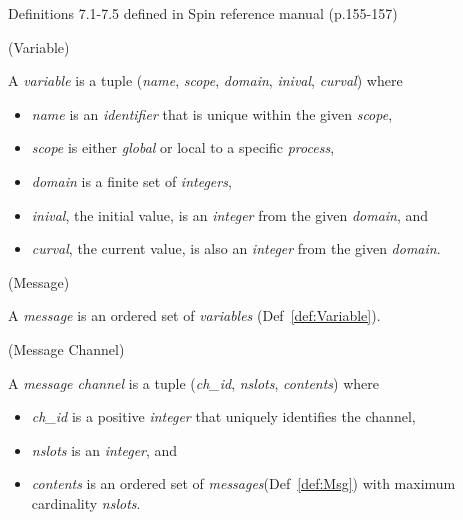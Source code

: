 Definitions 7.1-7.5 defined in Spin reference manual (p.155-157) \cite{spinreferencemanualbook}

\begin{definition}{}{}
\label{def:Variable}
(Variable) 

A \textit{variable} is a tuple (\textit{name}, \textit{scope}, \textit{domain}, \textit{inival}, \textit{curval}) where

\begin{itemize}
\item[] \textit{name} is an \textit{identifier} that is unique within the given \textit{scope},
\item[] \textit{scope} is either \textit{global} or local to a specific \textit{process},
\item[] \textit{domain} is a finite set of \textit{integers},
\item[] \textit{inival}, the initial value, is an \textit{integer} from the given \textit{domain}, and
\item[] \textit{curval}, the current value, is also an \textit{integer} from the given \textit{domain}.
\end{itemize}
\end{definition}

\begin{definition}{}{}
\label{def:Msg}
(Message)

A \textit{message} is an ordered set of \textit{variables} (Def~\ref{def:Variable}).
\end{definition}

\begin{definition}{}{}
\label{def:MsgChan}
(Message Channel)

A \textit{message channel} is a tuple (\textit{ch\_id}, \textit{nslots}, \textit{contents}) where
\begin{itemize}
\item[] \textit{ch\_id} is a positive \textit{integer} that uniquely identifies the channel,
\item[] \textit{nslots} is an \textit{integer}, and
\item[] \textit{contents} is an ordered set of \textit{messages}(Def~\ref{def:Msg}) with maximum cardinality \textit{nslots}.
\end{itemize}
\end{definition}

